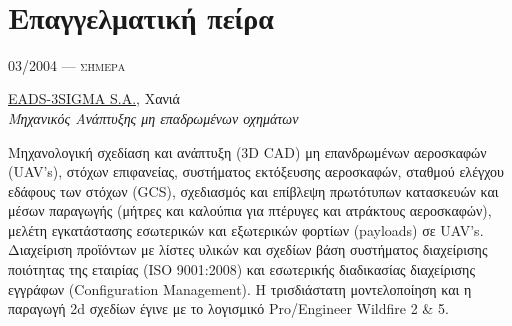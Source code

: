 \documentclass[11pt]{article} %
\begin{document}
\color{text1} %


\par{\\ %
	

\begin{minipage}[t]{0.48\textwidth}
\vspace{0pt} %
	

\section{Επαγγελματική πείρα} 


{\raggedleft\textsc{03/2004 --- σήμερα}\par}

{\raggedright\large \href{http://www.eads-3sigma.gr}{EADS-3SIGMA S.A.}, Χανιά\\

\textit{Μηχανικός Ανάπτυξης μη επαδρωμένων οχημάτων}\\[5pt]}

\normalsize{Μηχανολογική σχεδίαση και ανάπτυξη (3D CAD) μη επανδρωμένων αεροσκαφών (UAV's), στόχων επιφανείας, συστήματος 
εκτόξευσης αεροσκαφών, σταθμού ελέγχου εδάφους των στόχων (GCS), σχεδιασμός και επίβλεψη πρωτότυπων κατασκευών και μέσων 
παραγωγής (μήτρες και καλούπια για πτέρυγες και ατράκτους αεροσκαφών), μελέτη εγκατάστασης εσωτερικών και εξωτερικών φορτίων 
(payloads) σε UAV's. Διαχείριση προϊόντων με λίστες υλικών και σχεδίων βάση συστήματος διαχείρισης ποιότητας της εταιρίας (ISO 
9001:2008) και εσωτερικής διαδικασίας διαχείρισης εγγράφων (Configuration Management). Η τρισδιάστατη μοντελοποίηση και η 
παραγωγή 2d σχεδίων έγινε με το λογισμικό Pro/Engineer Wildfire 2 \& 5.}\\


\end{minipage}}
\end{document}
